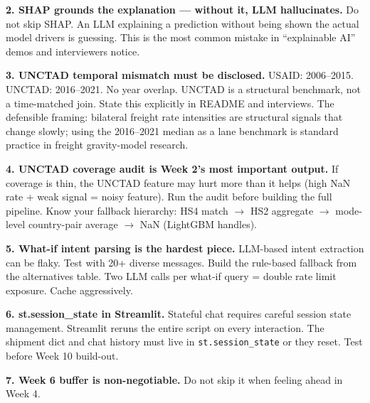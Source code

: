 \documentclass[11pt, a4paper]{article}
\begin{document}
\begin{warnbox}
\textbf{2. SHAP grounds the explanation --- without it, LLM hallucinates.} Do not skip SHAP. An LLM explaining a prediction without being shown the actual model drivers is guessing. This is the most common mistake in ``explainable AI'' demos and interviewers notice.
\end{warnbox}

\begin{warnbox}
\textbf{3. UNCTAD temporal mismatch must be disclosed.} USAID: 2006--2015. UNCTAD: 2016--2021. No year overlap. UNCTAD is a structural benchmark, not a time-matched join. State this explicitly in README and interviews. The defensible framing: bilateral freight rate intensities are structural signals that change slowly; using the 2016--2021 median as a lane benchmark is standard practice in freight gravity-model research.
\end{warnbox}

\begin{warnbox}
\textbf{4. UNCTAD coverage audit is Week 2's most important output.} If coverage is thin, the UNCTAD feature may hurt more than it helps (high NaN rate + weak signal = noisy feature). Run the audit before building the full pipeline. Know your fallback hierarchy: HS4 match $\rightarrow$ HS2 aggregate $\rightarrow$ mode-level country-pair average $\rightarrow$ NaN (LightGBM handles).
\end{warnbox}

\begin{warnbox}
\textbf{5. What-if intent parsing is the hardest piece.} LLM-based intent extraction can be flaky. Test with 20+ diverse messages. Build the rule-based fallback from the alternatives table. Two LLM calls per what-if query = double rate limit exposure. Cache aggressively.
\end{warnbox}

\begin{warnbox}
\textbf{6. st.session\_state in Streamlit.} Stateful chat requires careful session state management. Streamlit reruns the entire script on every interaction. The shipment dict and chat history must live in \texttt{st.session\_state} or they reset. Test before Week 10 build-out.
\end{warnbox}

\begin{warnbox}
\textbf{7. Week 6 buffer is non-negotiable.} Do not skip it when feeling ahead in Week 4.
\end{warnbox}
\end{document}
